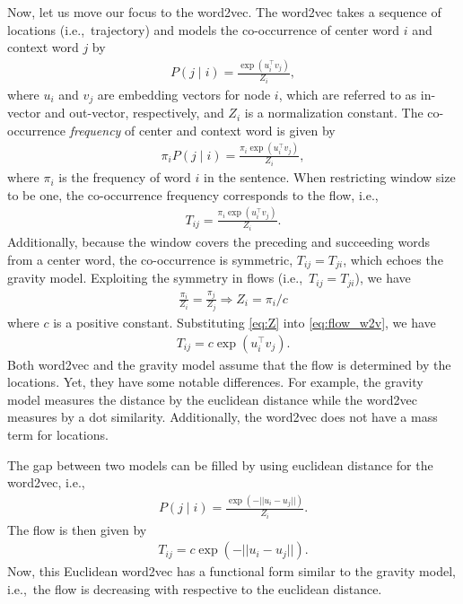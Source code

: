 \documentclass[12pt]{article} %
\def\given{\mid}
\def\ie{i.e.,~}
\begin{document}
Now, let us move our focus to the word2vec.
The word2vec takes a sequence of locations (\ie trajectory) and models the co-occurrence of center word $i$ and context word $j$ by
\begin{align}
    P(j\given i) = \frac{\exp(u_i ^\top v_j)}{Z_i},
\end{align}
where $u_i$ and $v_{j}$ are embedding vectors for node $i$, which are referred to as in-vector and out-vector, respectively, and $Z_i$ is a normalization constant.
The co-occurrence \emph{frequency} of center and context word is given by
\begin{align}
    \pi_i P(j\given i) = \frac{\pi_i\exp(u_i ^\top v_j)}{Z_i},
\end{align}
where $\pi_i$ is the frequency of word $i$ in the sentence. When restricting window size to be one, the co-occurrence frequency corresponds to the flow, \ie
\begin{align}
    T_{ij} = \frac{\pi_i\exp(u_i ^\top v_j)}{Z_i}. \label{eq:flow_w2v}
\end{align}
Additionally, because the window covers the preceding and succeeding words from a center word, the co-occurrence is symmetric, $T_{ij} = T_{ji}$, which echoes the gravity model.
Exploiting the symmetry in flows (\ie $T_{ij} = T_{ji}$), we have
\begin{align}
    \frac{\pi_i}{Z_i}  = \frac{\pi_j}{Z_j}
    \Rightarrow Z_i   = \pi_i / c \label{eq:Z}
\end{align}
where $c$ is a positive constant. Substituting \eqref{eq:Z} into \eqref{eq:flow_w2v}, we have
\begin{align}
    T_{ij} = c \exp(u_i ^\top v_j). \label{eq:flow_w2v2}
\end{align}
Both word2vec and the gravity model assume that the flow is determined by the locations.
Yet, they have some notable differences.
For example, the gravity model measures the distance by the euclidean distance while the word2vec measures by a dot similarity.
Additionally, the word2vec does not have a mass term for locations.

The gap between two models can be filled by using euclidean distance for the word2vec, \ie
\begin{align}
    P(j\given i) = \frac{\exp(-||u_i - u_j||)}{Z_i}.
\end{align}
The flow is then given by
\begin{align}
    T_{ij} = c \exp(-||u_i - u_j||).
\end{align}
Now, this Euclidean word2vec has a functional form similar to the gravity model, \ie the flow is decreasing with respective to the euclidean distance.
\end{document}
